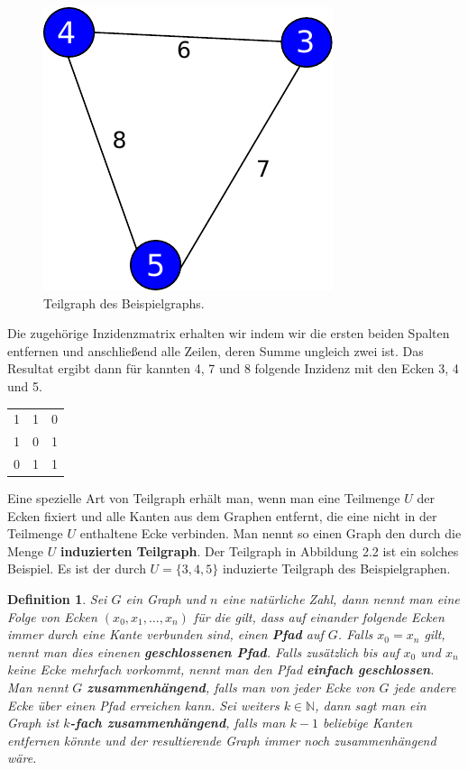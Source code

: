 \documentclass[11pt,a4paper,leqno]{report}
\newtheorem{definition}[theorem]{Definition}
\numberwithin{equation}{chapter}
\begin{document}
\begin{figure}[H]
	\begin{center}
		\includegraphics[scale=0.4]{Abbildungen/graph_1_teil.pdf}
		\caption{Teilgraph des Beispielgraphs.}
	\end{center}
\end{figure}
\noindent
Die zugeh\"orige Inzidenzmatrix erhalten wir indem wir die ersten beiden Spalten entfernen und anschlie{\ss}end alle Zeilen, deren Summe ungleich zwei ist. 
\noindent
Das Resultat ergibt dann f\"ur kannten 4, 7 und 8 folgende Inzidenz mit den Ecken 3, 4 und 5.
	\begin{center}
	\begin{tabular}{c c c}
		1 & 1 & 0\\
		1 & 0 & 1\\
		0 & 1 & 1\\
	\end{tabular} 
\end{center}
Eine spezielle Art von Teilgraph erh\"alt man, wenn man eine Teilmenge $U$ der Ecken fixiert und alle Kanten aus dem Graphen entfernt, die eine nicht in der Teilmenge $U$ enthaltene Ecke verbinden. Man nennt so einen Graph den durch die Menge $U$ \textbf{induzierten Teilgraph}. Der Teilgraph in Abbildung 2.2 ist ein solches Beispiel. Es ist der durch $U =\{3, 4, 5\}$ induzierte Teilgraph des Beispielgraphen.
\begin{definition}
	Sei $G$ ein Graph und $n$ eine nat\"urliche Zahl, dann nennt man eine Folge von Ecken $(x_0, x_1,\dots,x_n)$ f\"ur die gilt, dass auf einander folgende Ecken immer durch eine Kante verbunden sind, einen \textbf{Pfad} auf $G$. Falls $x_0 = x_n$ gilt, nennt man dies einenen \textbf{geschlossenen Pfad}. Falls zus\"atzlich bis auf $x_0$ und $x_n$ keine Ecke mehrfach vorkommt, nennt man den Pfad \textbf{einfach geschlossen}.\\
	Man nennt $G$ \textbf{zusammenh\"angend}, falls man von jeder Ecke von $G$ jede andere Ecke \"uber einen Pfad erreichen kann. Sei weiters $k\in\mathbb{N}$, dann sagt man ein Graph ist \textbf{$k$-fach zusammen\-h\"angend}, falls man $k - 1$ beliebige Kanten entfernen k\"onnte und der resultierende Graph immer noch zusammenh\"angend w\"are.
\end{definition}
\end{document}
